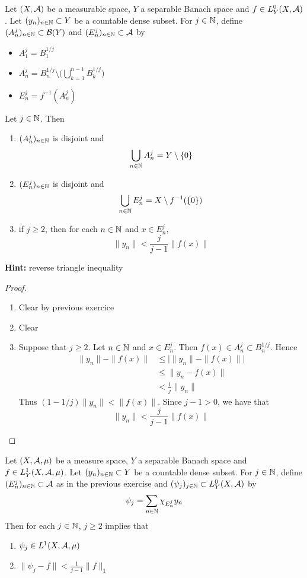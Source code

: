 \documentclass{book}
\begin{document}
	\begin{ex}
	Let $(X, \mathcal{A})$ be a measurable space, $Y$ a separable Banach space and $f \in L^0_Y(X, \mathcal{A})$.  Let $(y_n)_{n \in \mathbb{N}} \subset Y$ be a countable dense subset. For $j \in \mathbb{N}$, define $(A_n^j)_{n \in \mathbb{N}} \subset \mathcal{B}(Y)$ and $(E_n^j)_{n \in \mathbb{N}} \subset \mathcal{A}$ by  
	\begin{itemize}
			\item $A_1^j = B^{1/j}_1$ 
			\item $A_n^j = B^{1/j}_n  \setminus \bigg( \bigcup \limits_{k=1}^{n-1} B^{1/j}_k \bigg)$ 
			\item $E_n^j = f^{-1}(A^j_n)$ 
	\end{itemize}
	Let $j \in \mathbb{N}$. Then
	\begin{enumerate}
		\item $(A_n^j)_{n \in \mathbb{N}}$ is disjoint and $$\bigcup_{n \in \mathbb{N}}A_n^j = Y \setminus \{0\}$$
		\item $(E_n^j)_{n \in \mathbb{N}}$ is disjoint and $$\bigcup_{n \in \mathbb{N}}E_n^j = X \setminus f^{-1}(\{0\})$$
		\item if $j \geq 2$, then for each $n \in \mathbb{N}$ and $x \in E_n^j$, $$\|y_n\| < \frac{j}{j-1} \|f(x)\|$$
	\end{enumerate}
	\textbf{Hint:} reverse triangle inequality
	\end{ex}

	\begin{proof}\
		\begin{enumerate}
			\item Clear by previous exercice
			\item Clear
			\item Suppose that $j \geq 2$. Let $n \in \mathbb{N}$ and $x \in E_n^j$. Then $f(x) \in A_n^j \subset B_n^{1/j}$. Hence 
			\begin{align*}
				\|y_n\| - \|f(x)\|
				& \leq \bigg| \|y_n\| - \|f(x)\| \bigg| \\
				& \leq \|y_n - f(x)\| \\
				& < \frac{1}{j} \|y_n\|
			\end{align*}
			Thus $(1 - 1/j) \|y_n\| < \|f(x)\|$. Since $j-1 > 0$, we have that $$\|y_n\| < \frac{j}{j-1} \|f(x)\|$$
		\end{enumerate}
	\end{proof}
	
	\begin{ex}  
	Let $(X, \mathcal{A}, \mu)$ be a measure space, $Y$ a separable Banach space and $f \in L^1_Y(X, \mathcal{A}, \mu)$. Let $(y_n)_{n \in \mathbb{N}} \subset Y$ be a countable dense subset. For $j \in \mathbb{N}$, define $(E_n^j)_{n \in \mathbb{N}} \subset \mathcal{A}$ as in the previous exercise and $(\psi_j)_{j \in \mathbb{N}} \subset L^0_Y(X, \mathcal{A})$ by 
	$$\psi_j = \sum\limits_{n \in \mathbb{N}}\chi_{E_n^j}y_n$$  
	Then for each $j \in \mathbb{N}$, $j \geq 2$ implies that 
	\begin{enumerate}
		\item $\psi_j \in L^1(X, \mathcal{A}, \mu)$ 
		\item $\|\psi_j - f\| < \frac{1}{j - 1} \|f\|_1$
	\end{enumerate}
	\end{ex}
	
\end{document}
